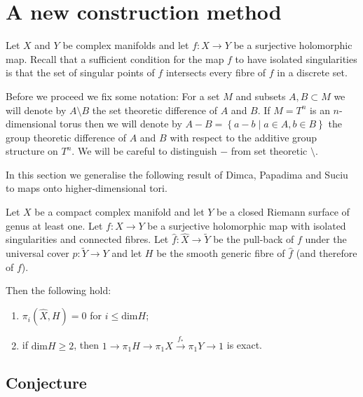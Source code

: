 \section{A new construction method}

\label{secMainThm}

Let $X$ and $Y$ be complex manifolds and let $f:X\rightarrow Y$ be a surjective holomorphic map. Recall that a sufficient condition for the map $f$ to have isolated singularities is that the set of singular points of $f$ intersects every fibre of $f$ in a discrete set.

Before we proceed we fix some notation: For a set $M$ and subsets $A,B\subset M$ we will denote by $A\setminus B$ the set theoretic difference of $A$ and $B$. If $M=T^n$ is an $n$-dimensional torus then we will denote by $A-B=\left\{a-b\mid a\in A, b\in B\right\}$ the group theoretic difference of $A$ and $B$ with respect to the additive group structure on $T^n$. We will be careful to distinguish $-$ from set theoretic $\setminus$.

In this section we generalise the following result of Dimca, Papadima and Suciu to maps onto higher-dimensional tori.

\begin{theorem}
Let $X$ be a compact complex manifold and let $Y$ be a closed Riemann surface of genus at least one. Let $f: X\rightarrow Y$ be a surjective holomorphic map with isolated singularities and connected fibres. Let $\widehat{f}: \widehat{X}\rightarrow \widetilde{Y}$ be the pull-back of $f$ under the universal cover $p:\widetilde{Y} \rightarrow Y$ and let $H$ be the smooth generic fibre of $\widehat{f}$ (and therefore of $f$).

Then the following hold:
\begin{enumerate}
 \item $\pi_i(\widehat{X},H)=0$ for $ i \leq \mathrm{dim}H$;
 \item if $\mathrm{dim} H \geq 2$, then  $1\rightarrow \pi_1 H\rightarrow \pi_1 X\overset{f_{\ast}}\rightarrow \pi_1 Y\rightarrow 1$ is exact.
\end{enumerate}
\label{thmC'}
\end{theorem}

\subsection{Conjecture}
\label{secConjThmC}




